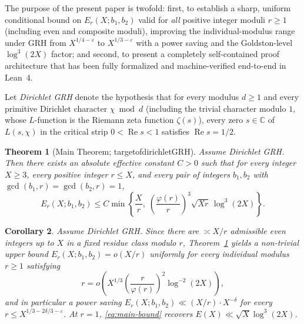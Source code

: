 \documentclass[11pt,reqno]{amsart}
\numberwithin{equation}{section}
\newtheorem{theorem}{Theorem}[section]
\newtheorem{corollary}[theorem]{Corollary}
\theoremstyle{definition}
\newcommand{\C}{\mathbb{C}}
\newcommand{\1}{\mathbf{1}}
\renewcommand{\Re}{\operatorname{Re}}
\newcommand{\lean}[1]{{\footnotesize\ttfamily\renewcommand{\_}{\textunderscore\allowbreak}#1}}
\newcommand{\GRH}{\textup{GRH}}
\begin{document}
The purpose of the present paper is twofold: first, to establish a sharp, uniform conditional bound on $E_r(X; b_1, b_2)$ valid for \emph{all} positive integer moduli $r \ge 1$ (including even and composite moduli), improving the individual-modulus range under \GRH{} from $X^{1/4-\varepsilon}$ to $X^{1/3-\varepsilon}$ with a power saving and the Goldston-level $\log^3(2X)$ factor; and second, to present a completely self-contained proof architecture that has been fully formalized and machine-verified end-to-end in Lean~4.

Let \emph{Dirichlet \GRH{}} denote the hypothesis that for every modulus $d \ge 1$ and every primitive Dirichlet character $\chi \bmod d$ (including the trivial character modulo $1$, whose $L$-function is the Riemann zeta function $\zeta(s)$), every zero $s \in \C$ of $L(s, \chi)$ in the critical strip $0 < \Re s < 1$ satisfies $\Re s = 1/2$.

\begin{theorem}[Main Theorem; \lean{target\_of\_dirichletGRH}]
\label{thm:main}
Assume Dirichlet \GRH{}. Then there exists an absolute effective constant $C > 0$ such that for every integer $X \ge 3$, every positive integer $r \le X$, and every pair of integers $b_1, b_2$ with $\gcd(b_1, r) = \gcd(b_2, r) = 1$,
\begin{equation}\label{eq:main-bound}
  E_r(X; b_1, b_2) \le C \min\!\left\{\frac{X}{r},\; \left(\frac{\varphi(r)}{r}\right)^3 \sqrt{X r}\,\log^3(2X)\right\}.
\end{equation}
\end{theorem}

\begin{corollary}\label{cor:range}
Assume Dirichlet \GRH{}. Since there are $\asymp X/r$ admissible even integers up to $X$ in a fixed residue class modulo $r$, Theorem~\ref{thm:main} yields a non-trivial upper bound $E_r(X; b_1, b_2) = o(X/r)$ uniformly for every individual modulus $r \ge 1$ satisfying
\[
  r = o\!\left(X^{1/3}\left(\frac{r}{\varphi(r)}\right)^2 \log^{-2}(2X)\right),
\]
and in particular a power saving $E_r(X; b_1, b_2) \ll (X/r)\cdot X^{-\delta}$ for every $r \le X^{1/3 - 2\delta/3 - \varepsilon}$. At $r = 1$, \eqref{eq:main-bound} recovers $E(X) \ll \sqrt{X}\log^3(2X)$.
\end{corollary}
\end{document}
